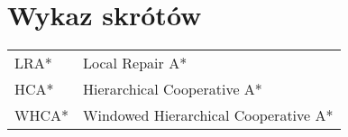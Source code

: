 \chapter*{Wykaz skrótów}

\begin{tabular}{l l}
LRA* & Local Repair A* \\
HCA* & Hierarchical Cooperative A* \\
WHCA* & Windowed Hierarchical Cooperative A* \\

\end{tabular}
